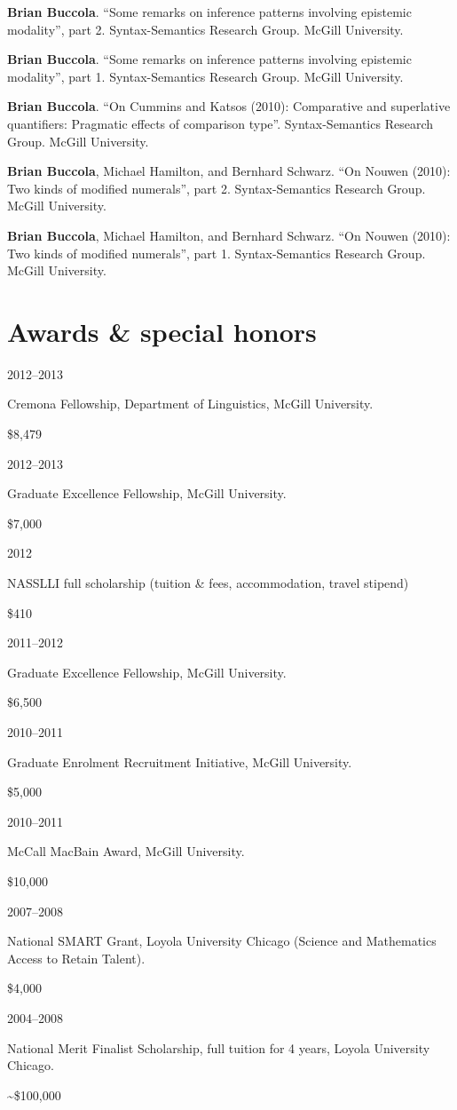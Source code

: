 \documentclass[11pt,letterpaper]{article}
\newcommand{\name}{Brian Buccola}
\newcommand{\cvitem}[2]{%
  \begin{minipage}[t]{0.24\textwidth}
    #1 %
  \end{minipage}
  \hfill
  \begin{minipage}[t]{0.74\textwidth}
    #2 %
  \end{minipage}
}
\newcommand{\award}[2]{%
  \begin{minipage}[t]{0.78\textwidth}
    #1        %
  \end{minipage}
  \hfill
  \begin{minipage}[t]{0.20\textwidth}
    \hfill #2 %
  \end{minipage}
}
\begin{document}
\cvitem{}{\textbf{\name}. ``Some remarks on inference
patterns involving epistemic modality'', part 2. Syntax-Semantics Research
Group.  McGill University.}

\cvitem{}{\textbf{\name}. ``Some remarks on inference
patterns involving epistemic modality'', part 1. Syntax-Semantics Research
Group.  McGill University.}

\cvitem{}{\textbf{\name}. ``On Cummins and Katsos
(2010): Comparative and superlative quantifiers: Pragmatic effects of comparison
type''.  Syntax-Semantics Research Group. McGill University.}

\cvitem{}{\textbf{\name}, Michael Hamilton, and Bernhard
Schwarz.  ``On Nouwen (2010): Two kinds of modified numerals'', part 2.
Syntax-Semantics Research Group. McGill University.}

\cvitem{}{\textbf{\name}, Michael Hamilton, and Bernhard
Schwarz.  ``On Nouwen (2010): Two kinds of modified numerals'', part 1.
Syntax-Semantics Research Group. McGill University.}



\section*{Awards \& special honors}

\cvitem{2012--2013}{\award{Cremona Fellowship, Department of Linguistics, McGill
University.}{\$8,479}}

\cvitem{2012--2013}{\award{Graduate Excellence Fellowship, McGill
University.}{\$7,000}}

\cvitem{2012}{\award{NASSLLI full scholarship (tuition \& fees, accommodation,
travel stipend)}{\$410}}

\cvitem{2011--2012}{\award{Graduate Excellence Fellowship, McGill
University.}{\$6,500}}

\cvitem{2010--2011}{\award{Graduate Enrolment Recruitment Initiative, McGill
University.}{\$5,000}}

\cvitem{2010--2011}{\award{McCall MacBain Award, McGill University.}{\$10,000}}

\cvitem{2007--2008}{\award{National SMART Grant, Loyola University Chicago
(Science and Mathematics Access to Retain Talent).}{\$4,000}}

\cvitem{2004--2008}{\award{National Merit Finalist Scholarship, full tuition for
4 years, Loyola University Chicago.}{\textasciitilde\$100,000}}
\end{document}
